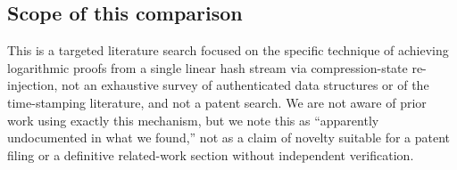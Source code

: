 \subsection{Scope of this comparison}

This is a targeted literature search focused on the specific technique of
achieving logarithmic proofs from a single linear hash stream via
compression-state re-injection, not an exhaustive survey of authenticated
data structures or of the time-stamping literature, and not a patent
search. We are not aware of prior work using exactly this mechanism, but we note this as ``apparently
undocumented in what we found,'' not as a claim of novelty suitable for a
patent filing or a definitive related-work section without independent
verification.
